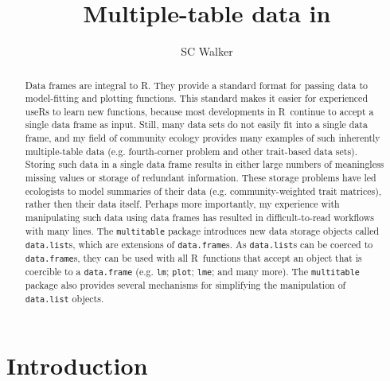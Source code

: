 \documentclass{article}
\title{Multiple-table data in \R}
\author{SC Walker}
\newcommand{\R}{{\sf R}}
\newcommand{\code}[1]{\texttt{#1}}
\numberwithin{exercise}{section}
\begin{document}
\maketitle



\begin{abstract}
Data frames are integral to \R.  They provide a standard format for passing data to model-fitting and plotting functions.  This standard makes it easier for experienced use\R s to learn new functions, because most developments in \R\ continue to accept a single data frame as input.  Still, many data sets do not easily fit into a single data frame, and my field of community ecology provides many examples of such inherently multiple-table data (e.g. fourth-corner problem and other trait-based data sets).  Storing such data in a single data frame results in either large numbers of meaningless missing values or storage of redundant information.  These storage problems have led ecologists to model summaries of their data (e.g. community-weighted trait matrices), rather then their data itself.  Perhaps more importantly, my experience with manipulating such data using data frames has resulted in difficult-to-read workflows with many lines.  The \code{multitable} package introduces new data storage objects called \code{data.list}s, which are extensions of \code{data.frame}s.  As \code{data.list}s can be coerced to \code{data.frame}s, they can be used with all \R\ functions that accept an object that is coercible to a \code{data.frame} (e.g. \code{lm}; \code{plot}; \code{lme}; and many more).  The \code{multitable} package also provides several mechanisms for simplifying the manipulation of \code{data.list} objects.
\end{abstract}


\section{Introduction}
\end{document}
